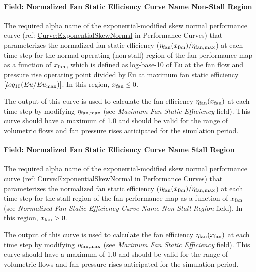 \paragraph{Field: Normalized Fan Static Efficiency Curve Name Non-Stall Region}\label{field-normalized-fan-static-efficiency-curve-name-non-stall-region}

The required alpha name of the exponential-modified skew normal performance curve (ref: \hyperref[curveexponentialskewnormal]{Curve:ExponentialSkewNormal} in Performance Curves) that parameterizes the normalized fan static efficiency (\(\eta_{\rm{fan}}(x_{\rm{fan}}) / \eta_{\rm{fan, max}}\)) at each time step for the normal operating (non-stall) region of the fan performance map as a function of \(x_{\rm{fan}}\), which is defined as log-base-10 of Eu at the fan flow and pressure rise operating point divided by Eu at maximum fan static efficiency \([log_{10}(Eu / Eu_{\rm{max}})]\). In this region, \(x_{\rm{fan}} \le 0\).

The output of this curve is used to calculate the fan efficiency \(\eta_{\rm{fan}} (x_{\rm{fan}})\) at each time step by modifying \(\eta_{\rm{fan, max}}\) (see \emph{Maximum Fan Static Efficiency} field). This curve should have a maximum of 1.0 and should be valid for the range of volumetric flows and fan pressure rises anticipated for the simulation period.

\paragraph{Field: Normalized Fan Static Efficiency Curve Name Stall Region}\label{field-normalized-fan-static-efficiency-curve-name-stall-region}

The required alpha name of the exponential-modified skew normal performance curve (ref: \hyperref[curveexponentialskewnormal]{Curve:ExponentialSkewNormal} in Performance Curves) that parameterizes the normalized fan static efficiency (\(\eta_{\rm{fan}} (x_{\rm{fan}}) / \eta_{\rm{fan, max}}\)) at each time step for the stall region of the fan performance map as a function of \(x_{\rm{fan}}\) (see \emph{Normalized Fan Static Efficiency Curve Name Non-Stall Region} field). In this region, \(x_{\rm{fan}} > 0\).

The output of this curve is used to calculate the fan efficiency \(\eta_{\rm{fan}} ( x_{\rm{fan}} )\) at each time step by modifying \(\eta_{\rm{fan, max}}\) (see \emph{Maximum Fan Static Efficiency} field). This curve should have a maximum of 1.0 and should be valid for the range of volumetric flows and fan pressure rises anticipated for the simulation period.

